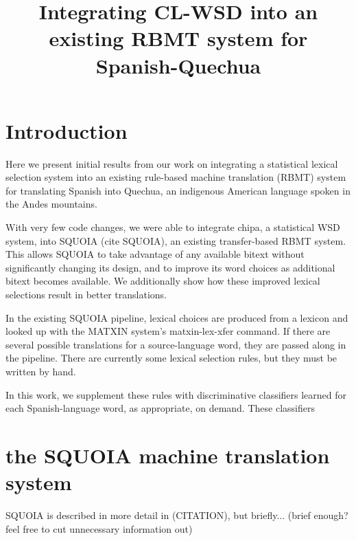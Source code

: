 \documentclass[10pt, a4paper]{article}
\title{Integrating CL-WSD into an existing RBMT system for Spanish-Quechua}
\begin{document}
\maketitleabstract

\section{Introduction}
Here we present initial results from our work on integrating a statistical
lexical selection system into an existing rule-based machine translation (RBMT)
system for translating Spanish into Quechua, an indigenous American language
spoken in the Andes mountains.


With very few code changes, we were able to integrate chipa, a statistical WSD
system, into SQUOIA (cite SQUOIA),
an existing transfer-based RBMT system. This
allows SQUOIA to take advantage of any available bitext without significantly
changing its design, and to improve its word choices as additional bitext
becomes available. We additionally show how these improved lexical selections
result in better translations.


In the existing SQUOIA pipeline, lexical choices are produced from a lexicon
and looked up with the MATXIN system's matxin-lex-xfer command. If there are
several possible translations for a source-language word, they are passed along
in the pipeline. There are currently some lexical selection rules, but they
must be written by hand.


In this work, we supplement these rules with discriminative classifiers learned
for each Spanish-language word, as appropriate, on demand. These classifiers 


\section{the SQUOIA machine translation system}
SQUOIA is described in more detail in (CITATION), but briefly...
(brief enough? feel free to cut unnecessary information out)
\end{document}
